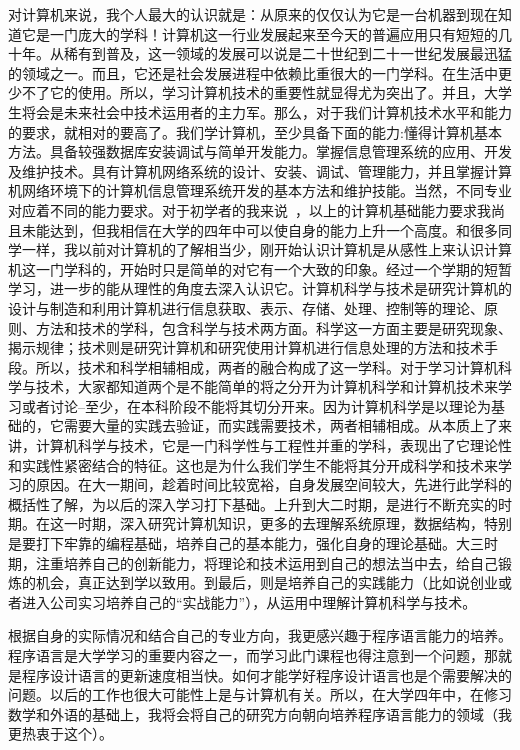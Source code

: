 \documentclass{article}
\begin{document}
对计算机来说，我个人最大的认识就是：从原来的仅仅认为它是一台机器到现在知道它是一门庞大的学科！计算机这一行业发展起来至今天的普遍应用只有短短的几十年。从稀有到普及，这一领域的发展可以说是二十世纪到二十一世纪发展最迅猛的领域之一。而且，它还是社会发展进程中依赖比重很大的一门学科。在生活中更少不了它的使用。所以，学习计算机技术的重要性就显得尤为突出了。并且，大学生将会是未来社会中技术运用者的主力军。那么，对于我们计算机技术水平和能力的要求，就相对的要高了。我们学计算机，至少具备下面的能力:懂得计算机基本方法。具备较强数据库安装调试与简单开发能力。掌握信息管理系统的应用、开发及维护技术。具有计算机网络系统的设计、安装、调试、管理能力，并且掌握计算机网络环境下的计算机信息管理系统开发的基本方法和维护技能。当然，不同专业对应着不同的能力要求。对于初学者的我来说 ，以上的计算机基础能力要求我尚且未能达到，但我相信在大学的四年中可以使自身的能力上升一个高度。和很多同学一样，我以前对计算机的了解相当少，刚开始认识计算机是从感性上来认识计算机这一门学科的，开始时只是简单的对它有一个大致的印象。经过一个学期的短暂学习，进一步的能从理性的角度去深入认识它。计算机科学与技术是研究计算机的设计与制造和利用计算机进行信息获取、表示、存储、处理、控制等的理论、原则、方法和技术的学科，包含科学与技术两方面。科学这一方面主要是研究现象、揭示规律；技术则是研究计算机和研究使用计算机进行信息处理的方法和技术手段。所以，技术和科学相辅相成，两者的融合构成了这一学科。对于学习计算机科学与技术，大家都知道两个是不能简单的将之分开为计算机科学和计算机技术来学习或者讨论--至少，在本科阶段不能将其切分开来。因为计算机科学是以理论为基础的，它需要大量的实践去验证，而实践需要技术，两者相辅相成。从本质上了来讲，计算机科学与技术，它是一门科学性与工程性并重的学科，表现出了它理论性和实践性紧密结合的特征。这也是为什么我们学生不能将其分开成科学和技术来学习的原因。在大一期间，趁着时间比较宽裕，自身发展空间较大，先进行此学科的概括性了解，为以后的深入学习打下基础。上升到大二时期，是进行不断充实的时期。在这一时期，深入研究计算机知识，更多的去理解系统原理，数据结构，特别是要打下牢靠的编程基础，培养自己的基本能力，强化自身的理论基础。大三时期，注重培养自己的创新能力，将理论和技术运用到自己的想法当中去，给自己锻炼的机会，真正达到学以致用。到最后，则是培养自己的实践能力（比如说创业或者进入公司实习培养自己的“实战能力”），从运用中理解计算机科学与技术。

根据自身的实际情况和结合自己的专业方向，我更感兴趣于程序语言能力的培养。程序语言是大学学习的重要内容之一，而学习此门课程也得注意到一个问题，那就是程序设计语言的更新速度相当快。如何才能学好程序设计语言也是个需要解决的问题。以后的工作也很大可能性上是与计算机有关。所以，在大学四年中，在修习数学和外语的基础上，我将会将自己的研究方向朝向培养程序语言能力的领域（我更热衷于这个）。 
\par
\end{document}
